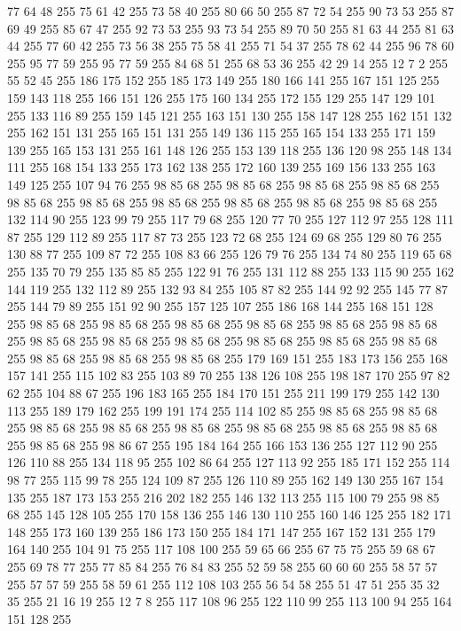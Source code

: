 77 64 48 255 75 61 42 255 73 58 40 255 80 66 50 255 87 72 54 255 90 73 53 255 87 69 49 255 85 67 47 255 92 73 53 255 93 73 54 255 89 70 50 255 81 63 44 255 81 63 44 255 77 60 42 255 73 56 38 255 75 58 41 255 71 54 37 255 78 62 44 255 96 78 60 255 95 77 59 255 95 77 59 255 84 68 51 255 68 53 36 255 42 29 14 255 12 7 2 255 55 52 45 255 186 175 152 255 185 173 149 255 180 166 141 255 167 151 125 255 159 143 118 255 166 151 126 255 175 160 134 255 172 155 129 255 147 129 101 255 133 116 89 255 159 145 121 255 163 151 130 255 158 147 128 255 162 151 132 255 162 151 131 255 165 151 131 255 149 136 115 255 165 154 133 255 171 159 139 255 165 153 131 255 161 148 126 255 153 139 118 255 136 120 98 255 148 134 111 255 168 154 133 255 173 162 138 255 172 160 139 255 169 156 133 255 163 149 125 255 107 94 76 255 98 85 68 255 98 85 68 255 98 85 68 255 98 85 68 255 98 85 68 255 98 85 68 255 98 85 68 255 98 85 68 255
98 85 68 255 98 85 68 255 132 114 90 255 123 99 79 255 117 79 68 255 120 77 70 255 127 112 97 255 128 111 87 255 129 112 89 255 117 87 73 255 123 72 68 255 124 69 68 255 129 80 76 255 130 88 77 255 109 87 72 255 108 83 66 255 126 79 76 255 134 74 80 255 119 65 68 255 135 70 79 255 135 85 85 255 122 91 76 255 131 112 88 255 133 115 90 255 162 144 119 255 132 112 89 255 132 93 84 255 105 87 82 255 144 92 92 255 145 77 87 255 144 79 89 255 151 92 90 255 157 125 107 255 186 168 144 255 168 151 128 255 98 85 68 255 98 85 68 255 98 85 68 255 98 85 68 255 98 85 68 255 98 85 68 255 98 85 68 255 98 85 68 255 98 85 68 255 98 85 68 255 98 85 68 255 98 85 68 255 98 85 68 255 98 85 68 255 98 85 68 255 179 169 151 255 183 173 156 255 168 157 141 255 115 102 83 255 103 89 70 255 138 126 108 255 198 187 170 255 97 82 62 255 104 88 67 255 196 183 165 255 184 170 151 255 211 199 179 255 142 130 113 255 189 179 162 255
199 191 174 255 114 102 85 255 98 85 68 255 98 85 68 255 98 85 68 255 98 85 68 255 98 85 68 255 98 85 68 255 98 85 68 255 98 85 68 255 98 85 68 255 98 86 67 255 195 184 164 255 166 153 136 255 127 112 90 255 126 110 88 255 134 118 95 255 102 86 64 255 127 113 92 255 185 171 152 255 114 98 77 255 115 99 78 255 124 109 87 255 126 110 89 255 162 149 130 255 167 154 135 255 187 173 153 255 216 202 182 255 146 132 113 255 115 100 79 255 98 85 68 255 145 128 105 255 170 158 136 255 146 130 110 255 160 146 125 255 182 171 148 255 173 160 139 255 186 173 150 255 184 171 147 255 167 152 131 255 179 164 140 255 104 91 75 255 117 108 100 255 59 65 66 255 67 75 75 255 59 68 67 255 69 78 77 255 77 85 84 255 76 84 83 255 52 59 58 255 60 60 60 255 58 57 57 255 57 57 59 255 58 59 61 255 112 108 103 255 56 54 58 255 51 47 51 255 35 32 35 255 21 16 19 255 12 7 8 255 117 108 96 255 122 110 99 255 113 100 94 255 164 151 128 255
